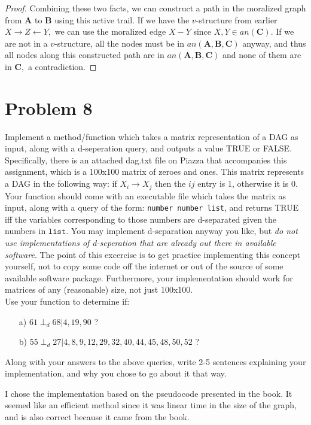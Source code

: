 \documentclass[letterpaper]{article}
\begin{document}
\begin{proof}
    Combining these two facts, we can construct a path in the moralized graph from $\mathbf{A}$ to $\mathbf{B}$ using this active trail. If we have the $v$-structure from earlier $X\to Z\gets Y,$ we can use the moralized edge $X - Y$ since $X, Y\in an(\mathbf{C}).$ If we are not in a $v$-structure, all the nodes must be in $an(\mathbf{A, B, C})$ anyway, and thus all nodes along this constructed path are in $an(\mathbf{A, B, C})$ and none of them are in $\mathbf{C},$ a contradiction.
\end{proof}

\newpage
\newpage
\section*{Problem 8}

Implement a method/function which takes a matrix representation of a DAG as input, along with a d-seperation query, and outputs a value TRUE or FALSE. Specifically, there is an attached dag.txt file on Piazza that accompanies this assignment, which is a 100x100 matrix of zeroes and ones. This matrix represents a DAG in the following way: if $X_i \rightarrow X_j$ then the $ij$ entry is 1, otherwise it is 0. Your function should come with an executable file which takes the matrix as input, along with a query of the form: \texttt{number number list}, and returns TRUE iff the variables corresponding to those numbers are d-separated given the numbers in $\texttt{list}$. You may implement d-separation anyway you like, but \emph{do not use implementations of d-seperation that are already out there in available software}. The point of this excercise is to get practice implementing this concept yourself, not to copy some code off the internet or out of the source of some available software package. Furthermore, your implementation should work for matrices of any (reasonable) size, not just 100x100.\\

Use your function to determine if:
\begin{itemize}
  \item[a)]  $61 \perp_d 68 | 4,19,90$ ?
\item[b)] $55 \perp_d 27 | 4,8,9,12,29,32,40,44,45,48,50,52$ ?
\end{itemize}
Along with your answers to the above queries, write 2-5 sentences explaining your implementation, and why you chose to go about it that way. \\ [3ex]
      \begin{answer*}
	I chose the implementation based on the pseudocode presented in the book. It seemed like an efficient method since it was linear time in the size of the graph, and is also correct because it came from the book. 
      \end{answer*}
\end{document}
